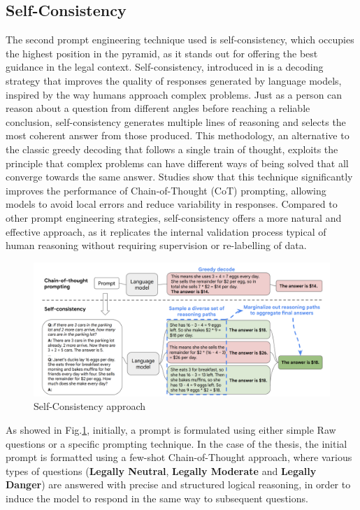 \subsection{Self-Consistency}
The second prompt engineering technique used is self-consistency, which occupies the highest position in the pyramid, as it stands out for offering the best guidance in the legal context.
Self-consistency, introduced in \cite{SC} is a decoding strategy that improves the quality of responses generated by language models, inspired by the way humans approach complex problems. Just as a person can reason about a question from different angles before reaching a reliable conclusion, self-consistency generates multiple lines of reasoning and selects the most coherent answer from those produced. This methodology, an alternative to the classic greedy decoding that follows a single train of thought, exploits the principle that complex problems can have different ways of being solved that all converge towards the same answer. Studies show that this technique significantly improves the performance of Chain-of-Thought (CoT) prompting, allowing models to avoid local errors and reduce variability in responses. Compared to other prompt engineering strategies, self-consistency offers a more natural and effective approach, as it replicates the internal validation process typical of human reasoning without requiring supervision or re-labelling of data.
\begin{figure}[H]
    \centering
    \includegraphics[width=0.7\linewidth]{Figures/SelfConsistency001-ae4a23fdbe90d35f633b1af73f721887.png}
    \caption{Self-Consistency approach}
    \label{fig:SC}
\end{figure}
As showed in Fig.\ref{fig:SC}, initially, a prompt is formulated using either simple Raw questions or a specific prompting technique. In the case of the thesis, the initial prompt is formatted using a few-shot Chain-of-Thought approach, where various types of questions (\textbf{Legally Neutral}, \textbf{Legally Moderate} and \textbf{Legally Danger}) are answered with precise and structured logical reasoning, in order to induce the model to respond in the same way to subsequent questions.
